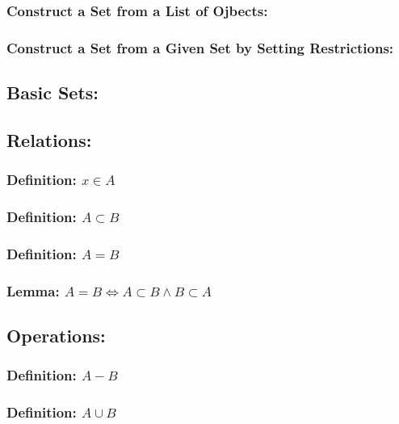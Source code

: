 \documentclass{article}
\begin{document}
\subsubsection{Construct a Set from a List of Ojbects:}
\vspace{30px}
\subsubsection{Construct a Set from a Given Set by Setting Restrictions:}
\vspace{30px}

\subsection{Basic Sets:}
\vspace{50px}

\subsection{Relations:}
\subsubsection{Definition: $x \in A$}
\vspace{30px}
\subsubsection{Definition: $A \subset B$}
\vspace{30px}
\subsubsection{Definition: $A=B$}
\vspace{30px}
\subsubsection{Lemma: $A=B \iff A \subset B \land B \subset A$}
\pagebreak

\subsection{Operations:}
\subsubsection{Definition: $A-B$}
\vspace{30px}
\subsubsection{Definition: $A \cup B$}
\vspace{30px}
\end{document}
